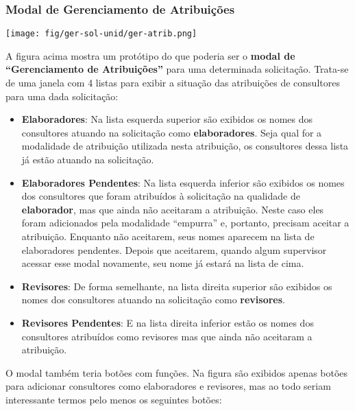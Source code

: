 	\subsubsection{Modal de Gerenciamento de Atribuições}

\begin{center}
	\texttt{[image: fig/ger-sol-unid/ger-atrib.png]}
\end{center}

A figura acima mostra um protótipo do que poderia ser o \textbf{modal de ``Gerenciamento de Atribuições''} para uma determinada solicitação. Trata-se de uma janela com 4 listas para exibir a situação das atribuições de consultores para uma dada solicitação:

\begin{itemize}
	\item  \textbf{Elaboradores}: Na lista esquerda superior são exibidos os nomes dos consultores atuando na solicitação como \textbf{elaboradores}. Seja qual for a modalidade de atribuição utilizada nesta atribuição, os consultores dessa lista já estão atuando na solicitação. 
	
	\item \textbf{Elaboradores Pendentes}: Na lista esquerda inferior são exibidos os nomes dos consultores que foram atribuídos à solicitação na qualidade de \textbf{elaborador}, mas que ainda não aceitaram a atribuição. Neste caso eles foram adicionados pela modalidade ``empurra'' e, portanto, precisam aceitar a atribuição. Enquanto não aceitarem, seus nomes aparecem na lista de elaboradores pendentes. Depois que aceitarem, quando algum supervisor acessar esse modal novamente, seu nome já estará na lista de cima.
	
	\item \textbf{Revisores}: De forma semelhante, na lista direita superior são exibidos os nomes dos consultores atuando na solicitação como \textbf{revisores}.  
	
	\item \textbf{Revisores Pendentes}: E na lista direita inferior estão os nomes dos consultores atribuídos como revisores mas que ainda não aceitaram a atribuição.
\end{itemize}

O modal também teria botões com funções. Na figura são exibidos apenas botões para adicionar consultores como elaboradores e revisores, mas ao todo seriam interessante termos pelo menos os seguintes botões:

